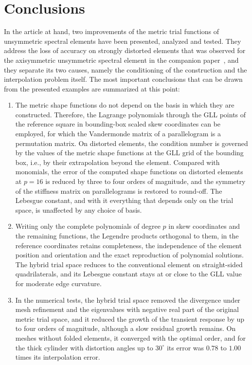 \section{Conclusions}
\label{sec:conclusions}
%
In the article at hand, two improvements of the metric trial functions of unsymmetric spectral elements have been presented, analyzed and tested. They address the loss of accuracy on strongly distorted elements that was observed for the axisymmetric unsymmetric spectral element in the companion paper~\cite{Eisentraeger2026axisymmetric}, and they separate its two causes, namely the conditioning of the construction and the interpolation problem itself. The most important conclusions that can be drawn from the presented examples are summarized at this point:
\begin{enumerate}
  \item The metric shape functions do not depend on the basis in which they are constructed. Therefore, the Lagrange polynomials through the GLL points of the reference square in bounding-box scaled skew coordinates can be employed, for which the Vandermonde matrix of a parallelogram is a permutation matrix. On distorted elements, the condition number is governed by the values of the metric shape functions at the GLL grid of the bounding box, i.e., by their extrapolation beyond the element. Compared with monomials, the error of the computed shape functions on distorted elements at $p=16$ is reduced by three to four orders of magnitude, and the symmetry of the stiffness matrix on parallelograms is restored to round-off. The Lebesgue constant, and with it everything that depends only on the trial space, is unaffected by any choice of basis.
  \item Writing only the complete polynomials of degree $p$ in skew coordinates and the remaining functions, the Legendre products orthogonal to them, in the reference coordinates retains completeness, the independence of the element position and orientation and the exact reproduction of polynomial solutions. The hybrid trial space reduces to the conventional element on straight-sided quadrilaterals, and its Lebesgue constant stays at or close to the GLL value for moderate edge curvature.
  \item In the numerical tests, the hybrid trial space removed the divergence under mesh refinement and the eigenvalues with negative real part of the original metric trial space, and it reduced the growth of the transient response by up to four orders of magnitude, although a slow residual growth remains. On meshes without folded elements, it converged with the optimal order, and for the thick cylinder with distortion angles up to $30^\circ$ its error was $0.78$ to $1.00$ times its interpolation error.

\end{enumerate}
